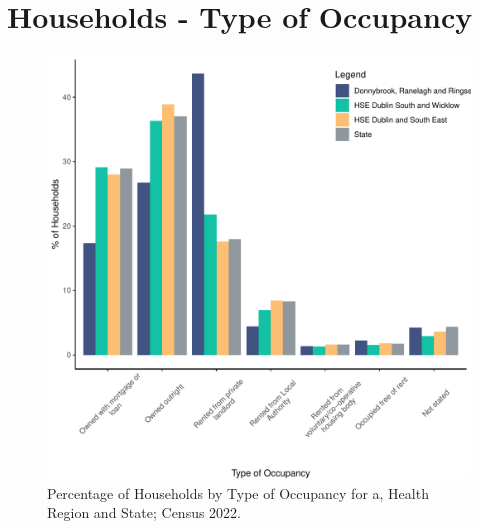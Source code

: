 \documentclass{article}
\begin{document}
\section{Households - Type of Occupancy}\label{sect:Households}
\begin{figure}[H]
	\centering
	\includegraphics[width = 140mm]{../figures/HouseholdsED.pdf}
	\caption{Percentage of Households by Type of Occupancy for a, Health Region and State; Census 2022.}
	\label{fig:vbnv}
	\end{figure}
\end{document}
